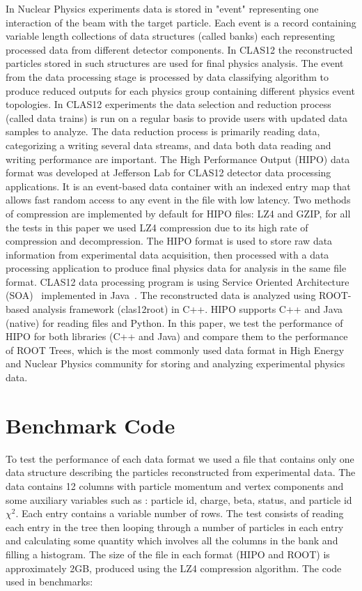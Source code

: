 \documentclass[preprint,12pt]{elsarticle}
\begin{document}
In Nuclear Physics experiments data is stored in "event" representing one interaction of the beam with the target particle. 
Each event is a record containing variable length collections of data structures (called banks) each representing processed 
data from different detector components. 
In CLAS12 the reconstructed particles stored in such structures are used for final physics analysis. The event from the data 
processing stage is processed by data classifying algorithm to produce reduced outputs for each physics group containing 
different physics event topologies. In CLAS12 experiments the data selection and reduction process (called data trains) is
run on a regular basis to provide users with updated data samples to analyze. The data reduction process is primarily reading
data, categorizing a writing several data streams, and data both data reading and writing performance are important.
The High Performance Output (HIPO) data format was developed at Jefferson Lab for CLAS12 detector data processing 
applications. It is an event-based data container with an indexed entry map that allows fast random access to any event in the file
with low latency. Two methods of compression are implemented by default for HIPO files: LZ4 and GZIP, for all the tests in this 
paper we used LZ4 compression due to its high rate of compression and decompression. 
The HIPO format is used to store raw data information from experimental data acquisition, then processed with a data processing 
application to produce final physics data for analysis in the same file format. 
CLAS12 data processing program is using Service Oriented Architecture (SOA)~\cite{Gyurjyan:2011zz} implemented in Java~\cite{Ziegler:2020gsr}. 
The reconstructed data is analyzed using ROOT-based analysis framework (clas12root) in C++. HIPO supports C++ and Java (native) for reading files
and Python. In this paper, we test the performance of HIPO for both libraries (C++ and Java) and compare them to the performance of
ROOT Trees, which is the most commonly used data format in High Energy and Nuclear Physics community for storing and analyzing
experimental physics data.

\section{Benchmark Code}

To test the performance of each data format we used a file that contains only one data structure 
describing the particles reconstructed from experimental data. The data contains 12 columns 
with particle momentum and vertex components and some auxiliary variables such as :
particle id, charge, beta, status, and particle id $\chi^2$. Each entry contains a variable number of
rows. The test consists of reading each entry in the tree then looping through a number of particles
in each entry and calculating some quantity which involves all the columns in the bank and filling a histogram.
The size of the file in each format (HIPO and ROOT) is approximately 2GB, produced using the LZ4 
compression algorithm. The code used in benchmarks:
\end{document}
